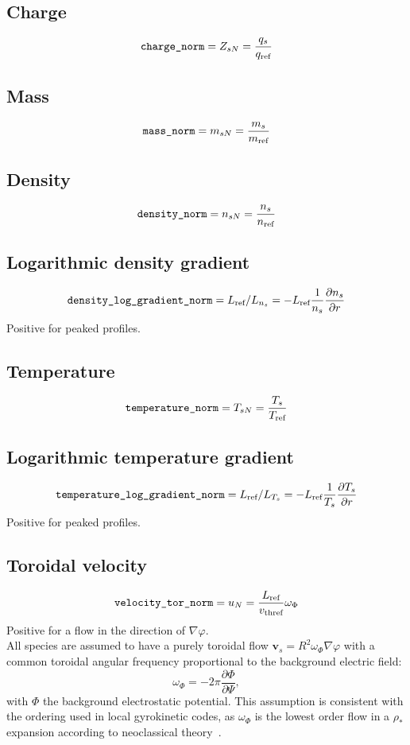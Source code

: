 \documentclass[a4paper]{report}
\begin{document}
\subsection{Charge} \label{sec:charge}
$$\texttt{charge\_norm}=Z_{sN}=\frac{q_s}{q_{\textrm{ref}}}$$
\subsection{Mass} \label{sec:mass}
$$\texttt{mass\_norm}=m_{sN}=\frac{m_s}{m_{\textrm{ref}}}$$
\subsection{Density} \label{sec:density}
$$\texttt{density\_norm}=n_{sN}=\frac{n_s}{n_{\textrm{ref}}}$$
\subsection{Logarithmic density gradient} \label{sec:dndr}
$$\texttt{density\_log\_gradient\_norm}=L_{\textrm{ref}}/L_{n_s}=-L_{\textrm{ref}} \frac{1}{n_s}\frac{\partial n_s}{\partial r}$$
Positive for peaked profiles. 
\subsection{Temperature} \label{sec:temperature}
$$\texttt{temperature\_norm}=T_{sN}=\frac{T_s}{T_{\textrm{ref}}}$$
\subsection{Logarithmic temperature gradient} \label{sec:dTdr}
$$\texttt{temperature\_log\_gradient\_norm}=L_{\textrm{ref}}/L_{T_s}=-L_{\textrm{ref}} \frac{1}{T_s}\frac{\partial T_s}{\partial r}$$
Positive for peaked profiles.
\subsection{Toroidal velocity} \label{sec:torrot}
$$\texttt{velocity\_tor\_norm}=u_{N}=\frac{L_{\textrm{ref}}}{v_\textrm{thref}}\omega_{\Phi}$$
Positive for a flow in the direction of $\nabla \varphi$.\\
All species are assumed to have a purely toroidal flow $\mathbf{v}_s=R^2\omega_\Phi\nabla \varphi$ with a common toroidal angular frequency proportional to the background electric field:
$$\omega_{\Phi}=-2\pi\frac{\partial \Phi}{\partial \Psi},$$
with $\Phi$ the background electrostatic potential. This assumption is consistent with the ordering used in local gyrokinetic codes, as $\omega_\Phi$ is the lowest order flow in a $\rho_*$ expansion according to neoclassical theory~\cite{Hirshman:NF1981}.
\end{document}
